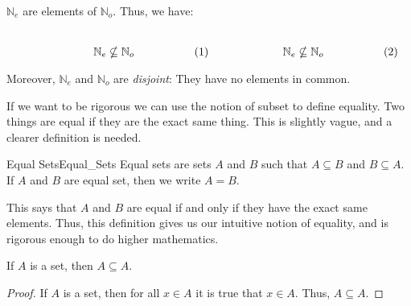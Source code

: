 \begin{lexample}{}{}
                $\mathbb{N}_{e}$ are elements of $\mathbb{N}_{o}$.
                Thus, we have:
                \par
                \begin{subequations}
                    \begin{minipage}{0.49\textwidth}
                        \centering
                        \begin{equation}
                            \mathbb{N}_{e}\nsubseteq\mathbb{N}_{o}
                        \end{equation}
                    \end{minipage}
                    \hfill
                    \begin{minipage}{0.49\textwidth}
                        \centering
                        \begin{equation}
                            \mathbb{N}_{e}\nsubseteq\mathbb{N}_{o}
                        \end{equation}
                    \end{minipage}
                \end{subequations}
                \par\vspace{2.5ex}
                Moreover, $\mathbb{N}_{e}$ and $\mathbb{N}_{o}$ are
                \textit{disjoint}: They have no elements in common.
            \end{lexample}
            If we want to be rigorous we can use the notion of
            subset to define equality. Two things are equal if they
            are the exact same thing. This is slightly vague, and a
            clearer definition is needed.
            \begin{ldefinition}{Equal Sets}{Equal_Sets}
                Equal sets are sets $A$ and $B$ such that
                $A\subseteq{B}$ and $B\subseteq{A}$. If $A$ and $B$
                are equal set, then we write $A=B$.
            \end{ldefinition}
            This says that $A$ and $B$ are equal if and only if
            they have the exact same elements. Thus, this definition
            gives us our intuitive notion of equality, and is
            rigorous enough to do higher mathematics.
            \begin{theorem}
                \label{thm:Set_Is_Sub_of_Self}%
                If $A$ is a set, then $A\subseteq{A}$.
            \end{theorem}
            \begin{proof}
                If $A$ is a set, then for all $x\in{A}$ it is true that
                $x\in{A}$. Thus, $A\subseteq{A}$.
            \end{proof}

